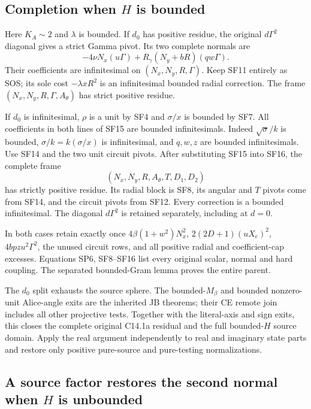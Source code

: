 \subsection{Completion when $H$ is bounded}

Here $K_A\sim2$ and $\lambda$ is bounded. If $d_0$ has positive
residue, the original $d\Gamma^2$ diagonal gives a strict Gamma
pivot. Its two complete normals are
\[
 -4\nu N_x(u\Gamma)
       +R_\gamma(N_y+bR)(qw\Gamma).
 \tag{SF16}
\]
Their coefficients are infinitesimal on $(N_x,N_y,R,\Gamma)$.
Keep SF11 entirely as SOS; its sole cost $-\lambda xR^2$ is an
infinitesimal bounded radial correction. The frame
$(N_x,N_y,R,\Gamma,A_\theta)$ has strict positive residue.

If $d_0$ is infinitesimal, $\rho$ is a unit by SF4 and
$\sigma/x$ is bounded by SF7. All coefficients in both lines of
SF15 are bounded infinitesimals. Indeed $\sqrt\sigma/k$ is
bounded, $\sigma/k=k(\sigma/x)$ is infinitesimal, and $q,w,z$
are bounded infinitesimals. Use SF14 and the two unit circuit
pivots. After substituting SF15 into SF16, the complete frame
\[
 (N_x,N_y,R,A_\theta,T,D_1,D_2)
 \tag{SF17}
\]
has strictly positive residue. Its radial block is SF8, its angular
and $T$ pivots come from SF14, and the circuit pivots from SF12.
Every correction is a bounded infinitesimal. The diagonal
$d\Gamma^2$ is retained separately, including at $d=0$.

In both cases retain exactly once $4\beta(1+w^2)N_x^2$,
$2(2D+1)(uX_e)^2$, $4bpzu^2\Gamma^2$, the unused circuit rows,
and all positive radial and coefficient-cap excesses. Equations
SP6, SF8--SF16 list every original scalar, normal and hard coupling.
The separated bounded-Gram lemma proves the entire parent.

The $d_0$ split exhausts the source sphere. The bounded-$M_\beta$
and bounded nonzero-unit Alice-angle exits are the inherited JB
theorems; their CE remote join includes all other projective tests.
Together with the literal-axis and sign exits, this closes the
complete original C14.1a residual and the full bounded-$H$ source
domain. Apply the real argument independently to real and imaginary
state parts and restore only positive pure-source and pure-testing
normalizations.

\subsection{A source factor restores the second normal when $H$ is unbounded}

